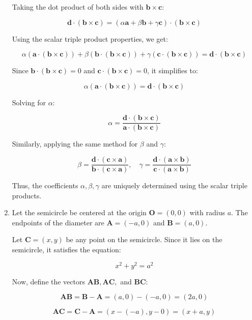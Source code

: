 \documentclass[12pt]{article}
\begin{document}
\begin{enumerate}
Taking the dot product of both sides with \(\mathbf{b} \times \mathbf{c}\):

\[
\mathbf{d} \cdot (\mathbf{b} \times \mathbf{c}) = (\alpha \mathbf{a} + \beta \mathbf{b} + \gamma \mathbf{c}) \cdot (\mathbf{b} \times \mathbf{c})
\]

Using the scalar triple product properties, we get:

\[
\alpha (\mathbf{a} \cdot (\mathbf{b} \times \mathbf{c})) + \beta (\mathbf{b} \cdot (\mathbf{b} \times \mathbf{c})) + \gamma (\mathbf{c} \cdot (\mathbf{b} \times \mathbf{c})) = \mathbf{d} \cdot (\mathbf{b} \times \mathbf{c})
\]

Since \(\mathbf{b} \cdot (\mathbf{b} \times \mathbf{c}) = 0\) and \(\mathbf{c} \cdot (\mathbf{b} \times \mathbf{c}) = 0\), it simplifies to:

\[
\alpha (\mathbf{a} \cdot (\mathbf{b} \times \mathbf{c})) = \mathbf{d} \cdot (\mathbf{b} \times \mathbf{c})
\]

Solving for \(\alpha\):

\[
\alpha = \frac{\mathbf{d} \cdot (\mathbf{b} \times \mathbf{c})}{\mathbf{a} \cdot (\mathbf{b} \times \mathbf{c})}
\]

Similarly, applying the same method for \(\beta\) and \(\gamma\):

\[
\beta = \frac{\mathbf{d} \cdot (\mathbf{c} \times \mathbf{a})}{\mathbf{b} \cdot (\mathbf{c} \times \mathbf{a})}, \quad
\gamma = \frac{\mathbf{d} \cdot (\mathbf{a} \times \mathbf{b})}{\mathbf{c} \cdot (\mathbf{a} \times \mathbf{b})}
\]

Thus, the coefficients \(\alpha, \beta, \gamma\) are uniquely determined using the scalar triple products.

\item 
Let the semicircle be centered at the origin \( \mathbf{O} = (0,0) \) with radius \( a \). The endpoints of the diameter are
\( \mathbf{A} = (-a,0) \) and \( \mathbf{B} = (a,0) \).

Let \( \mathbf{C} = (x,y) \) be any point on the semicircle. Since it lies on the semicircle, it satisfies the equation:

\[
x^2 + y^2 = a^2
\]

Now, define the vectors \( \mathbf{AB}, \mathbf{AC}, \) and \( \mathbf{BC} \):

\[
\mathbf{AB} = \mathbf{B} - \mathbf{A} = (a,0) - (-a,0) = (2a,0)
\]

\[
\mathbf{AC} = \mathbf{C} - \mathbf{A} = (x - (-a), y - 0) = (x + a, y)
\]


\end{enumerate}
\end{document}
